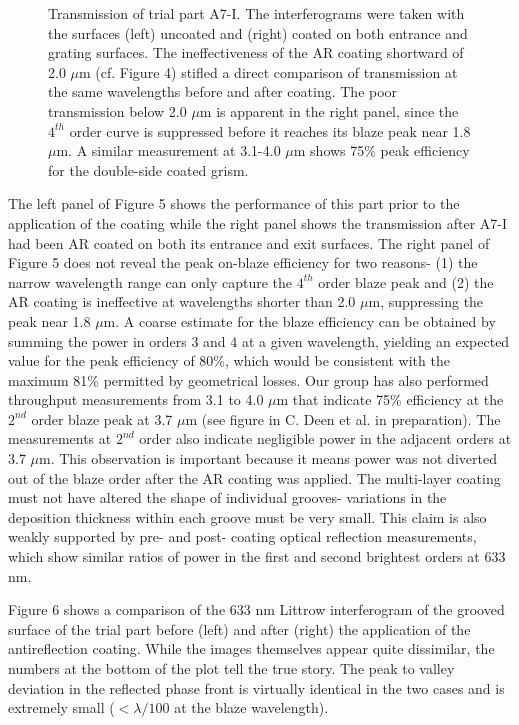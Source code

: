 \begin{figure}
\begin{minipage}[b]{0.5\linewidth}
\begin{tabular}{c}
   \end{tabular}
   \end{minipage}
   \caption[JWST grism transmission] {\label{fig:im5}  Transmission of trial part A7-I.  The interferograms were taken with the surfaces (left) uncoated and (right) coated on both entrance and grating surfaces.  The ineffectiveness of the AR coating shortward of 2.0 $\mu$m (cf. Figure 4) stifled a direct comparison of transmission at the same wavelengths before and after coating.  The poor transmission below 2.0 $\mu$m is apparent in the right panel, since the $4^{th}$ order curve is suppressed before it reaches its blaze peak near 1.8 $\mu$m.  A similar measurement at 3.1-4.0 $\mu$m shows 75\% peak efficiency for the double-side coated grism.}
   \end{figure} 

The left panel of Figure 5 shows the performance of this part prior to the application of the coating while the right panel shows the transmission after A7-I had been AR coated on both its entrance and exit surfaces.  The right panel of Figure 5 does not reveal the peak on-blaze efficiency for two reasons- (1) the narrow wavelength range can only capture the $4^{th}$ order blaze peak and (2) the AR coating is ineffective at wavelengths shorter than 2.0 $\mu$m, suppressing the peak near 1.8 $\mu$m.  A coarse estimate for the blaze efficiency can be obtained by summing the power in orders 3 and 4 at a given wavelength, yielding an expected value for the peak efficiency of 80\%, which would be consistent with the maximum 81\% permitted by geometrical losses.  Our group has also performed throughput measurements from 3.1 to 4.0 $\mu$m that indicate 75\% efficiency at the $2^{nd}$ order blaze peak at 3.7 $\mu$m (see figure in C. Deen et al. in preparation).  The measurements at $2^{nd}$ order also indicate negligible power in the adjacent orders at 3.7 $\mu$m.  This observation is important because it means power was not diverted out of the blaze order after the AR coating was applied.  The multi-layer coating must not have altered the shape of individual grooves- variations in the deposition thickness within each groove must be very small.  This claim is also weakly supported by pre- and post- coating optical reflection measurements, which show similar ratios of power in the first and second brightest orders at 633 nm.  

Figure 6 shows a comparison of the 633 nm Littrow interferogram of the grooved surface of the trial part before (left) and after (right) the application of the antireflection coating.  While the images themselves appear quite dissimilar, the numbers at the bottom of the plot tell the true story.  The peak to valley deviation in the reflected phase front is virtually identical in the two cases and is extremely small ($< \lambda/100$ at the blaze wavelength). 



